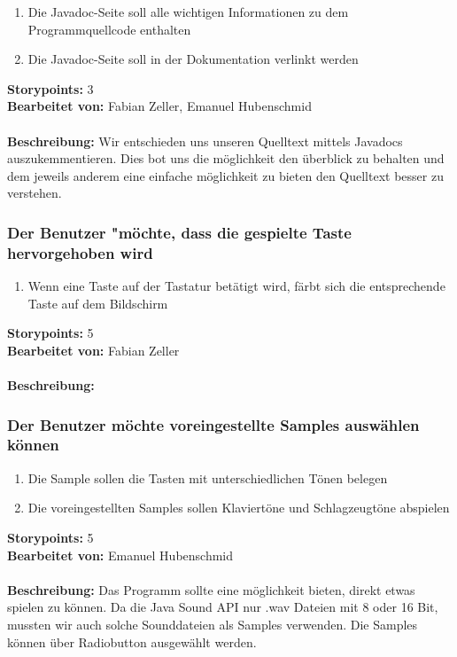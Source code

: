 \begin{enumerate}
 \item Die Javadoc-Seite soll alle wichtigen Informationen zu dem Programmquellcode enthalten
 \item Die Javadoc-Seite soll in der Dokumentation verlinkt werden
\end{enumerate}

\textbf{Storypoints:} 3 \\
\textbf{Bearbeitet von:} Fabian Zeller, Emanuel Hubenschmid \\
\\
\textbf{Beschreibung:} Wir entschieden uns unseren Quelltext mittels Javadocs auszukemmentieren. 
Dies bot uns die möglichkeit den überblick zu behalten und dem jeweils anderem eine einfache 
möglichkeit zu bieten den Quelltext besser zu verstehen.


\subsubsection{Der Benutzer "möchte, dass die gespielte Taste hervorgehoben wird}

\begin{enumerate}
 \item Wenn eine Taste auf der Tastatur betätigt wird, färbt sich die entsprechende Taste auf dem 
Bildschirm
\end{enumerate}

\textbf{Storypoints:} 5 \\
\textbf{Bearbeitet von:} Fabian Zeller \\
\\
\textbf{Beschreibung:} 


\subsubsection{Der Benutzer möchte voreingestellte Samples auswählen können}

\begin{enumerate}
 \item Die Sample sollen die Tasten mit unterschiedlichen Tönen belegen
 \item Die voreingestellten Samples sollen Klaviertöne und Schlagzeugtöne 
abspielen
\end{enumerate}

\textbf{Storypoints:} 5 \\
\textbf{Bearbeitet von:} Emanuel Hubenschmid \\
\\
\textbf{Beschreibung:} Das Programm sollte eine möglichkeit bieten, direkt etwas spielen zu können. 
Da die Java Sound API nur .wav Dateien mit 8 oder 16 Bit, mussten wir auch solche Sounddateien als 
Samples verwenden. Die Samples können über Radiobutton ausgewählt werden.


